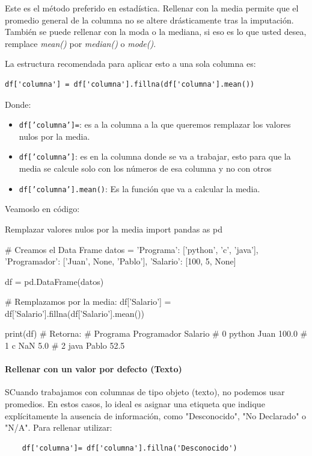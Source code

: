 Este es el método preferido en estadística. Rellenar con la media permite que el promedio general de la columna no se altere drásticamente tras la imputación. También se puede rellenar con la moda o la mediana, si eso es lo que usted desea, remplace \textit{mean()} por \textit{median()} o \textit{mode()}.

La estructura recomendada para aplicar esto a una sola columna es:
\begin{verbatim}
df['columna'] = df['columna'].fillna(df['columna'].mean())
\end{verbatim}

Donde:
\begin{itemize}
    \item \texttt{df['columna']=}: es a la columna a la que queremos remplazar los valores nulos por la media.
    \item \texttt{df['columna']}: es en la columna donde se va a trabajar, esto para que la media se calcule solo con los números de esa columna y no con otros
    \item \texttt{df['columna'].mean()}: Es la función que va a calcular la media. 
\end{itemize}

Veamoslo en código:
\begin{pycode}{Remplazar valores nulos por la media}
import pandas as pd

# Creamos el Data Frame
datos = {
    'Programa': ['python', 'c', 'java'],
    'Programador': ['Juan', None, 'Pablo'],
    'Salario': [100, 5, None]
}    

df = pd.DataFrame(datos)

# Remplazamos por la media:
df['Salario'] = df['Salario'].fillna(df['Salario'].mean()) 

print(df) # Retorna:
#   Programa Programador  Salario
# 0   python        Juan    100.0
# 1        c         NaN      5.0
# 2     java       Pablo     52.5

\end{pycode}


\paragraph{Rellenar con un valor por defecto (Texto)}

SCuando trabajamos con columnas de tipo objeto (texto), no podemos usar promedios. En estos casos, lo ideal es asignar una etiqueta que indique explícitamente la ausencia de información, como "Desconocido", "No Declarado" o "N/A". Para rellenar utilizar:
\begin{verbatim}
    df['columna']= df['columna'].fillna('Desconocido')
\end{verbatim}

